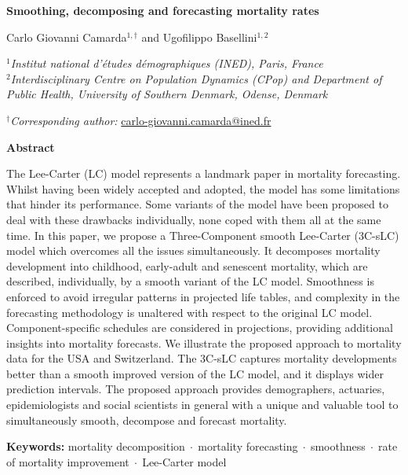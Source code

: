\documentclass[Thesis]{subfiles}
\begin{document}
\thispagestyle{empty}
{\centering
{\Large\bfseries Smoothing, decomposing and forecasting mortality rates \par}
\vspace{0.5cm}
{\large Carlo Giovanni Camarda$^{1,\dagger}$ and Ugofilippo Basellini$^{1,2}$ \par}
\singlespacing
{\normalsize $^{1}$\itshape Institut national d'\'{e}tudes d\'emographiques (INED), Paris, France\\[2mm]}
{\normalsize $^{2}$\itshape Interdisciplinary Centre on Population Dynamics (CPop) and Department of Public Health, University of Southern Denmark, Odense, Denmark\\[2mm]}
{\normalsize $^{\dagger}${\itshape Corresponding author:} \url{carlo-giovanni.camarda@ined.fr} \par}
\vspace{2.0cm}
{\bfseries Abstract \\[5mm]}
{\normalsize \justify The Lee-Carter (LC) model represents a landmark paper in mortality forecasting. Whilst having been widely accepted and adopted, the model has some limitations that hinder its performance. Some variants of the model have been proposed to deal with these drawbacks individually, none coped with them all at the same time. In this paper, we propose a Three-Component smooth Lee-Carter (3C-sLC) model which overcomes all the issues simultaneously. It decomposes mortality development into childhood, early-adult and senescent mortality, which are described, individually, by a smooth variant of the LC model. Smoothness is enforced to avoid irregular patterns in projected life tables, and complexity in the forecasting methodology is unaltered with respect to the original LC model. Component-specific schedules are considered in projections, providing additional insights into mortality forecasts. We illustrate the proposed approach to mortality data for the USA and Switzerland. The 3C-sLC captures mortality developments better than a smooth improved version of the LC model, and it displays wider prediction intervals. The proposed approach provides demographers, actuaries, epidemiologists and social scientists in general with a unique and valuable tool to simultaneously smooth, decompose and forecast mortality.   \par 
\vspace{0.5cm}	
\noindent \textbf{Keywords:} mortality decomposition$\;\cdot\;$mortality forecasting$\;\cdot\;$smoothness$\;\cdot\;$rate of mortality improvement$\;\cdot\;$Lee-Carter model}	
}
\end{document}
